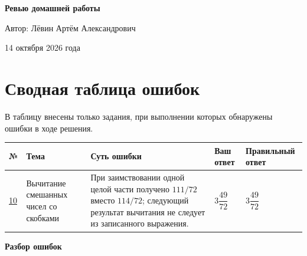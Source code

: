 \documentclass[11pt,a4paper]{article}
\begin{document}
\thispagestyle{empty}
\begin{center}
\vspace*{0.31\textheight}
{\Huge\bfseries Ревью домашней работы\par}
\vspace{20mm}
{\large Автор: Лёвин Артём Александрович\par}
\vspace{8mm}
{\large 14 октября 2026 года\par}
\end{center}
\vfill
\begin{center}
\end{center}
\newpage

\section*{Сводная таблица ошибок}
В таблицу внесены только задания, при выполнении которых обнаружены ошибки в ходе решения.

{\small
\begin{center}
\begin{tabular}{@{}>{\centering\arraybackslash}p{14mm}
                >{\raggedright\arraybackslash}p{29mm}
                >{\raggedright\arraybackslash}p{64mm}
                >{\centering\arraybackslash}p{24mm}
                >{\centering\arraybackslash}p{24mm}@{}}
\toprule
\textbf{№} & \textbf{Тема} & \textbf{Суть ошибки} & \textbf{Ваш ответ} & \textbf{Правильный ответ}\\
\midrule
\hyperref[task:10]{10} & Вычитание смешанных чисел со скобками &
При заимствовании одной целой части получено $111/72$ вместо $114/72$; следующий результат вычитания не следует из записанного выражения. &
$3\dfrac{49}{72}$ & $3\dfrac{49}{72}$\\
\bottomrule
\end{tabular}
\end{center}}

\newpage
\thispagestyle{empty}
\vspace*{\fill}
\begin{center}
{\LARGE\bfseries Разбор ошибок}
\end{center}
\vspace*{\fill}
\newpage

\label{task:10}
\end{document}
